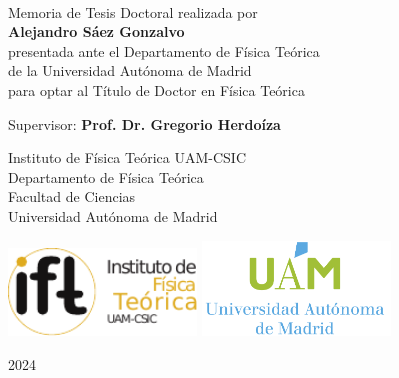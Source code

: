 \begin{titlepage}
    \begin{addmargin}[-1cm]{-3cm}
    \begin{center}
        \large

        \hfill

        \vfill

        \begingroup
            \color{CTtitle} \\ \bigskip
        \endgroup
        
        \vfill

        Memoria de Tesis Doctoral realizada por \\ \bigskip
        \textbf{Alejandro S\'aez Gonzalvo} \\ \bigskip
        presentada ante el Departamento de F\'isica Te\'orica \\
		de la Universidad Aut\'onoma de Madrid \\
        para optar al T\'itulo de Doctor en F\'isica Te\'orica

        \vfill

        Supervisor: \textbf{Prof. Dr. Gregorio Herdo\'iza}
        
        \bigskip
        
        Instituto de F\'isica Te\'orica UAM-CSIC \\
        Departamento de F\'isica Te\'orica \\
        Facultad de Ciencias \\
        Universidad Aut\'onoma de Madrid 
        
        \vfill
        
        \includegraphics[width=5cm]{gfx/LogoIFT.pdf} \hfill
        \includegraphics[width=5cm]{gfx/LogoUAMVertical.png} \\ 
        
        \vfill

        2024

        \vfill

    \end{center}
  \end{addmargin}
\end{titlepage}
